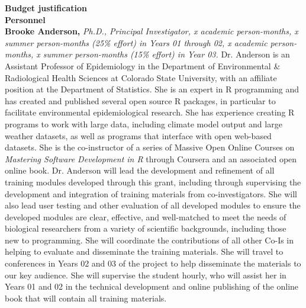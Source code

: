 \documentclass[pdftex,english,11pt,parskip=half]{scrartcl}
\begin{document}
\def\bf{\normalfont\bfseries}
\pagestyle{empty}

\textbf{Budget justification} \ \\

{\large \textbf{Personnel}} \\

\noindent \textbf{Brooke Anderson,} \textit{Ph.D., Principal Investigator, x academic person-months, x summer person-months (25\% effort) in Years 01 through 02, x academic person-months, x summer person-months (15\% effort) in Year 03.} Dr. Anderson is an Assistant Professor of Epidemiology in the Department of Environmental \& Radiological Health Sciences at Colorado State University, with an affiliate position at the Department of Statistics. She is an expert in R programming and has created and published several open source R packages, in particular to facilitate environmental epidemiological research. She has experience creating R programs to work with large data, including climate model output and large weather datasets, as well as programs that interface with open web-based datasets. She is the co-instructor of a series of Massive Open Online Courses on \textit{Mastering Software Development in R} through Coursera and an associated open online book. Dr. Anderson will lead the development and refinement of all training modules developed through this grant, including through supervising the development and integration of training materials from co-investigators. She will also lead user testing and other evaluation of all developed modules to ensure the developed modules are clear, effective, and well-matched to meet the needs of biological researchers from a variety of scientific backgrounds, including those new to programming. She will coordinate the contributions of all other Co-Is in helping to evaluate and disseminate the training materials. She will travel to conferences in Years 02 and 03 of the project to help disseminate the materials to our key audience. She will supervise the student hourly, who will assist her in Years 01 and 02 in the technical development and online publishing of the online book that will contain all training materials. 
\end{document}
